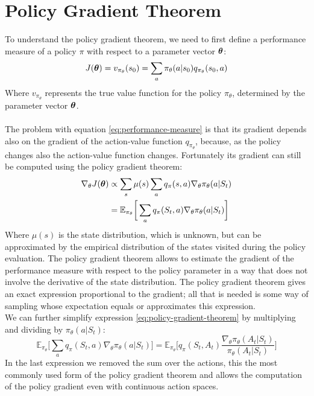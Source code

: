 \section{Policy Gradient Theorem}
To understand the policy gradient theorem, we need to first define a performance measure of a policy $\pi$ with respect to a parameter vector $\boldsymbol{\theta}$:
\begin{equation}
    J(\boldsymbol{\theta}) = v_{\pi_{\theta}}(s_0) = \sum_a \pi_{\theta}(a|s_0) q_{\pi_{\theta}}(s_0, a)
    \label{eq:performance-measure}
\end{equation}
Where $v_{\pi_{\theta}}$ represents the true value function for the policy $\pi_{\theta}$, determined by the parameter vector $\boldsymbol{\theta}$.\\\\
The problem with equation \ref{eq:performance-measure} is that its gradient depends also on the gradient of the action-value function $q_{\pi_{\theta}}$, because, as the policy changes also the action-value function changes. Fortunately its gradient can still be computed using the policy gradient theorem:
\begin{equation}
    \begin{split}
        \nabla_\theta J(\boldsymbol{\theta}) & \propto \sum_s \mu(s) \sum_a q_{\pi}(s, a) \nabla_{\theta}\pi_{\theta}(a|S_t)\\
        & = \mathbb{E}_{\pi_{\theta}} \bigg[\sum_a q_{\pi}(S_t, a) \nabla_{\theta}\pi_{\theta}(a|S_t) \bigg]
    \end{split}
    \label{eq:policy-gradient-theorem}
\end{equation}
Where $\mu(s)$ is the state distribution, which is unknown, but can be approximated by the empirical distribution of the states visited during the policy evaluation. The policy gradient theorem allows to estimate the gradient of the performance measure with respect to the policy parameter in a way that does not involve the derivative of the state distribution.
The policy gradient theorem gives an exact expression proportional to the gradient; all that is needed is some way of sampling
whose expectation equals or approximates this expression.\\
We can further simplify expression \eqref{eq:policy-gradient-theorem} by multiplying and dividing by $\pi_{\theta}(a|S_t)$:
\begin{equation}
    \mathbb{E}_{\pi_{\theta}} \bigg[\sum_a q_{\pi}(S_t, a) \nabla_{\theta}\pi_{\theta}(a|S_t) \bigg] = \mathbb{E}_{\pi_{\theta}} \bigg[q_{\pi}(S_t, A_t) \frac{\nabla_{\theta} \pi_{\theta}(A_t|S_t)}{\pi_{\theta}(A_t|S_t)} \bigg]
    \label{eq:single-action-policy-gradient}
\end{equation}
In the last expression we removed the sum over the actions, this the most commonly used form of the policy gradient theorem and allows the computation of the policy gradient even with continuous action spaces.

